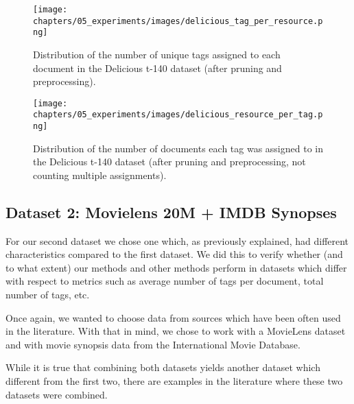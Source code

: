 \begin{figure}[!h]
    \centering
    \texttt{[image: chapters/05\_experiments/images/delicious\_tag\_per\_resource.png]}
    \caption{Distribution of the number of unique tags assigned to each document in the Delicious t-140 dataset (after pruning and preprocessing).}
    \label{fig:delicious_tag_doc_distr}
\end{figure}

\begin{figure}[H]
    \centering
    \texttt{[image: chapters/05\_experiments/images/delicious\_resource\_per\_tag.png]}
    \caption{Distribution of the number of documents each tag was assigned to in the Delicious t-140 dataset (after pruning and preprocessing, not counting multiple assignments).}
    \label{fig:delicious_tag_doc_distr}
\end{figure}

\subsection{Dataset 2: Movielens 20M + IMDB Synopses}\label{subsec:dataset_2}

For our second dataset we chose one which, as previously explained, had different characteristics compared to the first dataset. We did this to verify whether (and to what extent) our methods and other methods perform in datasets which differ with respect to metrics such as average number of tags per document, total number of tags, etc.

Once again, we wanted to choose data from sources which have been often used in the literature. With that in mind, we chose to work with a MovieLens dataset and with movie synopsis data from the International Movie Database.

While it is true that combining both datasets yields another dataset which different from the first two, there are examples in the literature \citep{peralta_2007,kataria_2016} where these two datasets were combined.

\renewcommand{\arraystretch}{1.5}


